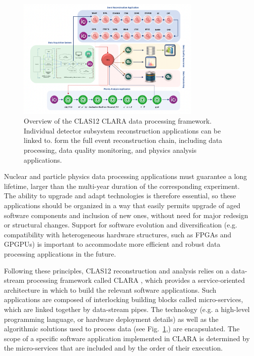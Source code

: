 \begin{figure}
\centering
\includegraphics[width=0.8\textwidth]{pics/clara-overview.pdf}
\caption{Overview of the CLAS12 CLARA data processing framework.  Individual detector subsystem reconstruction applications can be linked to. form the full event reconstruction chain, including  data processing, data quality monitoring, and physics analysis applications.}
\label{fig:clara-overview}
\end{figure}
Nuclear and particle physics data processing applications must guarantee a long lifetime, larger than the multi-year duration of the corresponding experiment. The ability to upgrade and adapt technologies is therefore essential, so these applications should be organized in a way that easily permits upgrade of aged software components and inclusion of new ones, without need for major redesign or structural changes.  Support for software evolution and diversification (e.g. compatibility with heterogeneous hardware structures, such as FPGAs and GPGPUs) is important to accommodate more efficient and robust data processing applications in the future.


Following these principles, CLAS12 reconstruction and analysis relies on a data-stream processing framework called CLARA \cite{clara-2011,clara-service,framework,clara-2016}, which provides a service-oriented architecture in which to build the relevant software applications.  Such applications are composed of interlocking building blocks called micro-services, which are linked together by data-stream pipes.  The technology (e.g. a high-level programming language, or hardware deployment details) as well as the algorithmic solutions used to process data (see Fig.~\ref{fig:clara-overview},) are encapsulated.
The scope of a specific software application implemented in CLARA is determined by the micro-services that are included and by the order of their execution.

